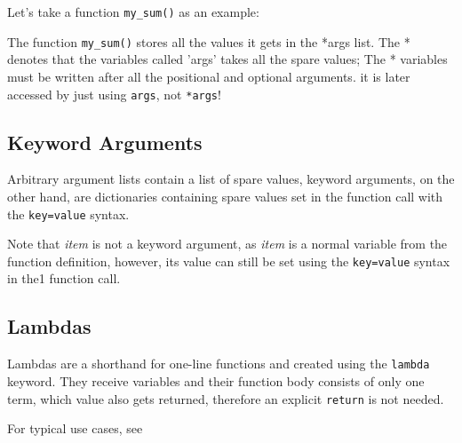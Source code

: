         Let's take a function \texttt{my_sum()} as an example:


        The function \texttt{my_sum()} stores all the values it gets in the *args list.
        The * denotes that the variables called 'args' takes all the spare values; The * variables must
        be written after all the positional and optional arguments.
        it is later accessed by just using \texttt{args}, not \texttt{*args}!

    \subsection{Keyword Arguments}
        Arbitrary argument lists contain a list of spare values, keyword arguments, on the other hand,
        are dictionaries containing spare values set in the function call with the
        \texttt{key=value} syntax.


        Note that \textit{item} is not a keyword argument, as \textit{item} is a normal variable
        from the function definition, however, its value can still be set using the
        \texttt{key=value} syntax in the1 function call.



    \subsection{Lambdas}
        Lambdas are a shorthand for one-line functions and created using the
        \texttt{lambda} keyword. They receive variables and their function body consists
        of only one term, which value also gets returned, therefore an explicit
        \texttt{return} is not needed.

        For typical use cases, see 

